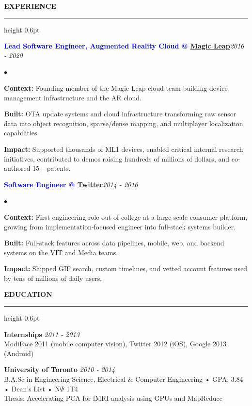 \documentclass[10pt]{resume}
\newenvironment{rSectionCompact}[1]{
  \medskip
  \vspace{0.5em}
  \textbf{\textcolor{Cerulean}{\MakeUppercase{#1}}}
  \vspace{0.3em}
  {\color{Blue}\hrule height 0.6pt}
  \vspace{0.6em}
  \begin{list}{}{
    \setlength{\leftmargin}{0em}
  }
  \item[]
}{
    \vspace{0.35em}
    \end{list}
}
\newenvironment{rJobCompact}[2]{
  \normalsize
  \textcolor{Blue}{\textbf{#1}}\hfill\textit{#2}
  \vspace{0.08em}
  \begin{list}{$\bullet$}{
    \setlength{\leftmargin}{1.6em}
    \setlength{\itemsep}{-0.05em}
    \setlength{\topsep}{0pt}
    \setlength{\partopsep}{0pt}
    \setlength{\parsep}{0pt}
  }
}{
    \end{list}
    \vspace{0.55em}
}
\begin{document}
\begin{rSectionCompact}{Experience}
    \begin{rJobCompact}{Lead Software Engineer, Augmented Reality Cloud @ \href{https://magicleap.com}{Magic Leap}}{2016 - 2020}
        \item \textbf{Context:} Founding member of the Magic Leap cloud team building device management infrastructure and the AR cloud.
        \item \textbf{Built:} OTA update systems and cloud infrastructure transforming raw sensor data into object recognition, sparse/dense mapping, and multiplayer localization capabilities.
        \item \textbf{Impact:} Supported thousands of ML1 devices, enabled critical internal research initiatives, contributed to demos raising hundreds of millions of dollars, and co-authored 15+ patents.
    \end{rJobCompact}

    \begin{rJobCompact}{Software Engineer @ \href{https://twitter.com}{Twitter}}{2014 - 2016}
        \item \textbf{Context:} First engineering role out of college at a large-scale consumer platform, growing from implementation-focused engineer into full-stack systems builder.
        \item \textbf{Built:} Full-stack features across data pipelines, mobile, web, and backend systems on the VIT and Media teams.
        \item \textbf{Impact:} Shipped GIF search, custom timelines, and vetted account features used by tens of millions of daily users.
    \end{rJobCompact}

\end{rSectionCompact}


\begin{rSectionCompact}{Education}
    \textbf{Internships} \hfill \textit{2011 - 2013} \\
    ModiFace 2011 (mobile computer vision), Twitter 2012 (iOS), Google 2013 (Android)

    \vspace{0.25em}
    \textbf{University of Toronto} \hfill \textit{2010 - 2014} \\
    B.A.Sc in Engineering Science, Electrical \& Computer Engineering • GPA: 3.84 • Dean's List • N$\Psi$ 1T4 \\
    Thesis: Accelerating PCA for fMRI analysis using GPUs and MapReduce

\end{rSectionCompact}
\end{document}
